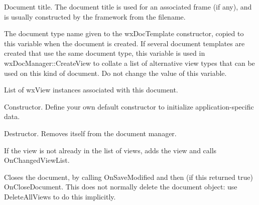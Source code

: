 
Document title. The document title is used for an associated
frame (if any), and is usually constructed by the framework from
the filename.

\label{documenttypename}


The document type name given to the wxDocTemplate constructor, copied to this
variable when the document is created. If several document templates are
created that use the same document type, this variable is used in wxDocManager::CreateView
to collate a list of alternative view types that can be used on this kind of
document. Do not change the value of this variable.

\label{wxdocumentmdocumentviews}


List of wxView instances associated with this document.

\label{wxdocumentctor}


Constructor. Define your own default constructor to initialize application-specific
data.

\label{wxdocumentdtor}


Destructor. Removes itself from the document manager.

\label{wxdocumentaddview}


If the view is not already in the list of views, adds the view and calls OnChangedViewList.

\label{wxdocumentclose}


Closes the document, by calling OnSaveModified and then (if this returned true) OnCloseDocument.
This does not normally delete the document object: use DeleteAllViews to do this implicitly.

\label{wxdocumentdeleteviews}


